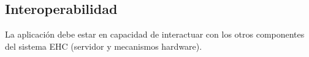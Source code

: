 \subsection{Interoperabilidad}
La aplicaci\'on debe estar en capacidad de interactuar con los otros componentes del sistema EHC (servidor y mecanismos hardware).
